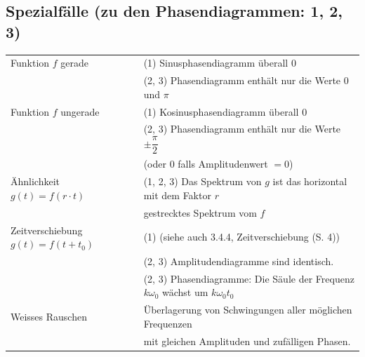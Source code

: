 	\subsection{Spezialfälle (zu den Phasendiagrammen: 1, 2, 3)}
		\begin{tabular}{ll}
			Funktion $f$ gerade & (1) Sinusphasendiagramm überall $0$\\[3pt]
			 & (2, 3) Phasendiagramm enthält nur die Werte $0$ und $\pi$\\[3pt]
	 		Funktion $f$ ungerade & (1) Kosinusphasendiagramm überall $0$\\[3pt]
	 		 & (2, 3) Phasendiagramm enthält nur die Werte $\pm \dfrac{\pi}{2}$\\[3pt] 
	 		 & (oder $0$ falls Amplitudenwert $= 0$)\\[3pt]
	 		Ähnlichkeit $g(t) = f(r \cdot t)$ & (1, 2, 3) Das Spektrum von $g$ ist das horizontal mit dem Faktor $r$\\[3pt]
	 		 & gestrecktes Spektrum vom $f$\\[3pt]
	 		Zeitverschiebung $g(t) = f(t + t_0)$ & (1) (siehe auch 3.4.4, Zeitverschiebung (S. 4))\\[3pt]
	 		 & (2, 3) Amplitudendiagramme sind identisch.\\[3pt]
	 		 & (2, 3) Phasendiagramme: Die Säule der Frequenz $k \omega_0$ wächst um $k \omega_0 t_0$\\[3pt]
	 		Weisses Rauschen & Überlagerung von Schwingungen aller möglichen Frequenzen\\[3pt]
	 		 & mit gleichen Amplituden und zufälligen Phasen.\\[3pt]
		\end{tabular}

